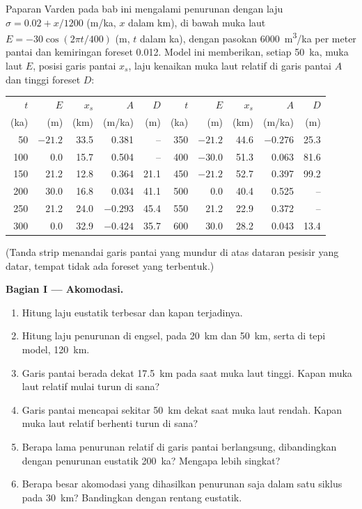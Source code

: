 \begin{problem}
\label{pb:b3:sequence-stratigraphy:1}
Paparan Varden pada bab ini mengalami penurunan dengan laju $\sigma = 0.02 + x/1200$
(\unit{m/ka}, $x$ dalam km), di bawah muka laut $E = -30\cos(2\pi t/400)$ (m,
$t$ dalam ka), dengan pasokan \qty{6000}{m^3/ka} per meter pantai dan
kemiringan foreset 0.012. Model ini memberikan, setiap \qty{50}{ka}, muka laut
$E$, posisi garis pantai $x_s$, laju kenaikan muka laut relatif di
garis pantai $A$ dan tinggi foreset $D$:

\begin{center}\small
\begin{tabular}{rrrrr|rrrrr}
$t$ & $E$ & $x_s$ & $A$ & $D$ & $t$ & $E$ & $x_s$ & $A$ & $D$\\
(ka) & (m) & (km) & (m/ka) & (m) & (ka) & (m) & (km) & (m/ka) & (m)\\\hline
50 & $-21.2$ & 33.5 & 0.381 & -- & 350 & $-21.2$ & 44.6 & $-0.276$ & 25.3\\
100 & 0.0 & 15.7 & 0.504 & -- & 400 & $-30.0$ & 51.3 & 0.063 & 81.6\\
150 & 21.2 & 12.8 & 0.364 & 21.1 & 450 & $-21.2$ & 52.7 & 0.397 & 99.2\\
200 & 30.0 & 16.8 & 0.034 & 41.1 & 500 & 0.0 & 40.4 & 0.525 & --\\
250 & 21.2 & 24.0 & $-0.293$ & 45.4 & 550 & 21.2 & 22.9 & 0.372 & --\\
300 & 0.0 & 32.9 & $-0.424$ & 35.7 & 600 & 30.0 & 28.2 & 0.043 & 13.4\\
\end{tabular}
\end{center}
(Tanda strip menandai garis pantai yang mundur di atas dataran pesisir yang datar, tempat
tidak ada foreset yang terbentuk.)

\medskip\noindent\textbf{Bagian I --- Akomodasi.}
\begin{enumerate}
\item Hitung laju eustatik terbesar dan kapan terjadinya.
\item Hitung laju penurunan di engsel, pada \qty{20}{km} dan \qty{50}{km}, serta
  di tepi model, \qty{120}{km}.
\item Garis pantai berada dekat \qty{17.5}{km} pada saat muka laut tinggi. Kapan
  muka laut relatif mulai turun di sana?
\item Garis pantai mencapai sekitar \qty{50}{km} dekat saat muka laut rendah. Kapan
  muka laut relatif berhenti turun di sana?
\item Berapa lama penurunan relatif di garis pantai berlangsung, dibandingkan dengan
  penurunan eustatik \qty{200}{ka}? Mengapa lebih singkat?
\item Berapa besar akomodasi yang dihasilkan penurunan saja dalam satu siklus pada
  \qty{30}{km}? Bandingkan dengan rentang eustatik.
\end{enumerate}


\end{problem}
